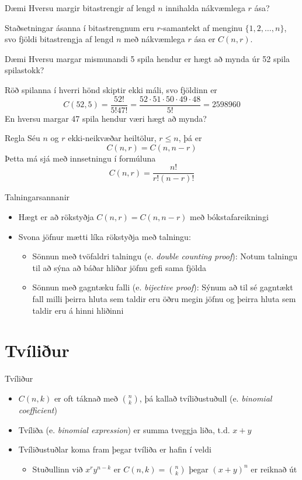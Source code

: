 \documentclass[handout]{beamer}
\begin{document}
\begin{frame}{Dæmi}
Hversu margir bitastrengir af lengd $n$ innihalda nákvæmlega $r$ ása? \pause

Staðsetningar ásanna í bitastrengnum eru $r$-samantekt af menginu $\{1,2,\ldots,n\}$, svo fjöldi bitastrengja af lengd $n$ með nákvæmlega $r$ ása er $C(n, r)$.
\end{frame}

\begin{frame}{Dæmi}
Hversu margar mismunandi 5 spila hendur er hægt að mynda úr 52 spila spilastokk? \pause

Röð spilanna í hverri hönd skiptir ekki máli, svo fjöldinn er
\[
 C(52,5) = \frac{52!}{5!47!} = \frac{52\cdot51\cdot50\cdot49\cdot48}{5!} = 2598960
\]
\pause
En hversu margar 47 spila hendur væri hægt að mynda?
\end{frame}

\begin{frame}{Regla}
Séu $n$ og $r$ ekki-neikvæðar heiltölur, $r \leq n$, þá er
\[
 C(n,r) = C(n,n-r)
\]
Þetta má sjá með innsetningu í formúluna 
\[
 C(n,r) = \frac{n!}{r!(n-r)!}
\]
\end{frame}

\begin{frame}{Talningarsannanir}
\begin{itemize}
 \item Hægt er að rökstyðja $C(n,r) = C(n,n-r)$ með bókstafareikningi
 \item Svona jöfnur mætti líka rökstyðja með talningu:
 \begin{itemize}
  \item Sönnun með tvöfaldri talningu (e. \emph{double counting proof}): Notum talningu til að sýna að báðar hliðar jöfnu gefi sama fjölda
  \item Sönnun með gagntæku falli (e. \emph{bijective proof}): Sýnum að til sé gagntækt fall milli þeirra hluta sem taldir eru öðru megin jöfnu og þeirra hluta sem taldir eru á hinni hliðinni
 \end{itemize}
\end{itemize}
\end{frame}

\section{Tvíliður}

\begin{frame}{Tvíliður}
\begin{itemize}
 \item $C(n,k)$ er oft táknað með $\binom{n}{k}$, þá kallað tvíliðustuðull (e. \emph{binomial coefficient})
 \item Tvíliða (e. \emph{binomial expression}) er summa tveggja liða, t.d. $x + y$
 \item Tvíliðustuðlar koma fram þegar tvíliða er hafin í veldi
 \begin{itemize}
  \item Stuðullinn við $x^ry^{n-k}$ er $C(n,k) = \binom{n}{k}$ þegar $(x + y)^n$ er reiknað út
 \end{itemize}
\end{itemize}
\end{frame}
\end{document}
